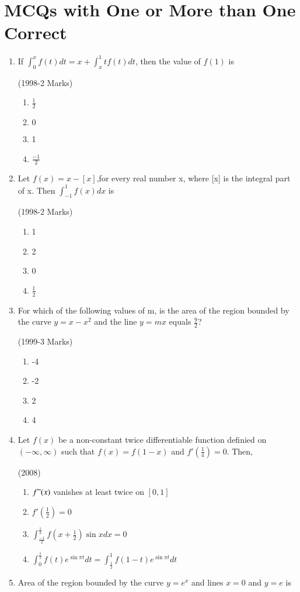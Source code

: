 \documentclass[journal,12pt,twocolumn]{IEEEtran}
\theoremstyle{remark}
\begin{document}
\section*{MCQs with One or More than One Correct}
\begin{enumerate}
	\item
		If $\int_{0}^{x}f(t)dt=x+\int_{x}^{1}tf(t)dt$, then the value of $f(1)$ is 

		\hfill{(1998-2 Marks)}
		\begin{multicols}{4}
		\begin{enumerate}
			\item $\frac{1}{2}$
			\item $0$
			\item 1
			\item $\frac{-1}{2}$
		\end{enumerate}
		\end{multicols}
	\item
		Let $f(x)=x-[x]$,for every real number x, where [x] is the integral part of x. Then $\int_{-1}^{1}f(x)dx$ is 

		\hfill{(1998-2 Marks)}
		\begin{multicols}{4}
		\begin{enumerate}
			\item 1
			\item 2
			\item 0
			\item $\frac{1}{2}$
		\end{enumerate}  
			\end{multicols}
	\item 
		For which of the following values of m, is the area of the region bounded by the curve $y=x-x^2$ and the line $y=mx$ equals $\frac{9}{2}$?

		\hfill{(1999-3 Marks)}
		\begin{multicols}{4}
		\begin{enumerate}
			\item -4
			\item -2
			\item 2
			\item 4
		\end{enumerate}
		\end{multicols}
	\item 
		Let $f(x)$ be a non-constant twice differentiable function definied on $(-\infty,\infty)$ such that $f(x)=f(1-x)$ and $f'(\frac{1}{4})=0$. Then,

		\hfill{(2008)}
		\begin{enumerate}
			\item $f"(x)$ vanishes at least twice on $[0,1]$
			\item $f'(\frac{1}{2})=0$
			\item $\int_{\frac{-1}{2}}^{\frac{1}{2}}f(x+\frac{1}{2})\sin xdx=0$
			\item $\int_{0}^{\frac{1}{2}}f(t)e^{\sin \pi{t}}dt=\int_{\frac{1}{2}}^{1}f(1-t)e^{\sin \pi{t}}dt$
		\end{enumerate}
	\item
		Area of the region bounded by the curve $y=e^x$ and lines $x=0$ and $y=e$ is


\end{enumerate}
\end{document}
